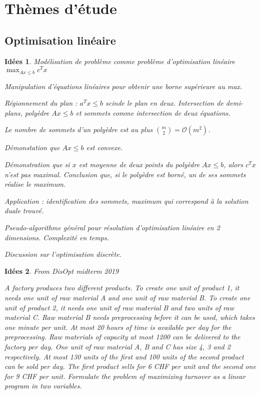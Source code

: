 \documentclass[a4paper,12pt, notitlepage]{article}
\theoremstyle{plain}
\newtheorem{idee}{Idées}
\begin{document}
\section{Thèmes d'étude}

\subsection{Optimisation linéaire}

\begin{idee}
	Modélisation de problème comme problème d'optimisation linéaire $\max_{Ax \leq b}{c^T x}$
	
	Manipulation d'équations linéaires pour obtenir une borne supérieure au max.
	
	Régionnement du plan : $a^T x \leq b$ scinde le plan en deux.
	Intersection de demi-plans, polyèdre $Ax \leq b$ et sommets comme intersection de deux équations.
	
	Le nombre de sommets d'un polyèdre est au plus ${m \choose 2} = \mathcal{O}(m^2)$.
	
	Démonstation que $Ax \leq b$ est convexe.
	
	Démonstration que si $x$ est moyenne de deux points du polyèdre $Ax \leq b$, alors $c^Tx$ n'est pas maximal.
	Conclusion que, si le polyèdre est borné, un de ses sommets réalise le maximum.
	
	Application : identification des sommets, maximum qui correspond à la solution duale trouvé.
	
	Pseudo-algorithme général pour résolution d'optimisation linéaire en 2 dimensions.
	Complexité en temps.
	
	Discussion sur l'optimisation discrète.	
\end{idee}

\begin{idee}
	From DisOpt midterm 2019
	
	A factory produces two different products. To create one unit of product 1, it needs one unit of
	raw material A and one unit of raw material B. To create one unit of product 2, it needs one unit
	of raw material B and two units of raw material C. Raw material B needs preprocessing before it
	can be used, which takes one minute per unit. At most 20 hours of time is available per day for
	the preprocessing. Raw materials of capacity at most 1200 can be delivered to the factory per day.
	One unit of raw material A, B and C has size 4, 3 and 2 respectively.
	At most 130 units of the first and 100 units of the second product can be sold per day. The first
	product sells for 6 CHF per unit and the second one for 9 CHF per unit.
	Formulate the problem of maximizing turnover as a linear program in two variables.

\end{idee}
\end{document}
